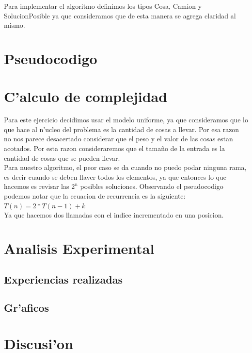 Para implementar el algoritmo definimos los tipos Cosa, Camion y SolucionPosible ya que consideramos que de esta manera se 
agrega claridad al mismo.

\section{Pseudocodigo}


\section{C'alculo de complejidad}
Para este ejercicio decidimos usar el modelo uniforme, ya que consideramos que lo que hace al n'ucleo del problema es la
cantidad de cosas a llevar. Por esa razon no nos parece desacertado considerar que el peso y el valor de las cosas estan 
acotados. Por esta razon consideraremos que el tama\~{n}o de la entrada es la cantidad de cosas que se pueden llevar.\\
Para nuestro algoritmo, el peor caso se da cuando no puedo podar ninguna rama, es decir cuando se deben llaver todos los elementos, ya que entonces lo que hacemos es revisar las $2^n$ posibles soluciones.
Observando el pseudocodigo podemos notar que la ecuacion de recurrencia es la siguiente:\\
	$T(n) = 2*T(n-1) + k$\\
	Ya que hacemos dos llamadas con el indice incrementado en una posicion.\\

\section{Analisis Experimental}
\subsection{Experiencias realizadas}

\subsection{Gr'aficos}

\section{Discusi'on}

	